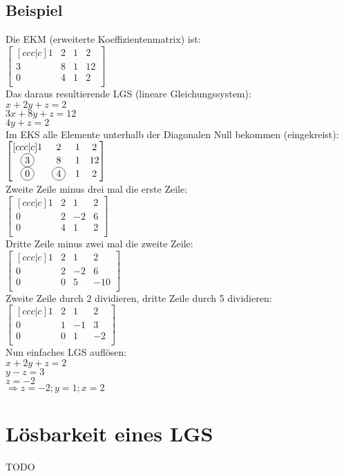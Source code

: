 \documentclass[../main.tex]{subfiles}
\begin{document}
\subsection{Beispiel}
Die EKM (erweiterte Koeffizientenmatrix) ist: \\

$\begin{bmatrix}[ccc|c]
    1 & 2 & 1& 2  \\
    3 & 8 & 1 & 12 \\
    0 & 4 & 1 & 2 \\
\end{bmatrix}$ 
\\ [7pt]
Das daraus resultierende LGS (lineare Gleichungssystem): \\
$x + 2y + z = 2$ \\
$3x + 8y + z = 12$ \\
$ 4y + z = 2$
\\ [7pt]
Im EKS alle Elemente unterhalb der Diagonalen Null bekommen (eingekreist): \\ [7pt]
$\begin{bmatrix}[ccc|c]
    1 & 2 & 1& 2  \\
    \circled{3} & 8 & 1 & 12 \\
    \circled{0} & \circled{4} & 1 & 2 \\
\end{bmatrix}$ 
\\ [7pt]
Zweite Zeile minus drei mal die erste Zeile: \\ [7pt]
$\begin{bmatrix}[ccc|c]
    1 & 2 & 1& 2  \\
    0 & 2 & -2 & 6 \\
    0 & 4 & 1 & 2 \\
\end{bmatrix}$ 
\\ [7pt]
Dritte Zeile minus zwei mal die zweite Zeile: \\ [7pt]
$\begin{bmatrix}[ccc|c]
    1 & 2 & 1& 2  \\
    0 & 2 & -2 & 6 \\
    0 & 0 & 5 & -10 \\
\end{bmatrix}$ 
\\ [7pt]
Zweite Zeile durch 2 dividieren, dritte Zeile durch 5 dividieren: \\ [7pt]
$\begin{bmatrix}[ccc|c]
    1 & 2 & 1& 2  \\
    0 & 1 & -1 & 3 \\
    0 & 0 & 1 & -2 \\
\end{bmatrix}$ 
\\ [7pt]
Nun einfaches LGS auflösen: \\ [7pt]
$x+2y+z=2$ \\
$y-z=3$ \\
$z=-2$ \\
$\Rightarrow z=-2; y=1; x=2$

\section{Lösbarkeit eines LGS}
TODO
\end{document}
